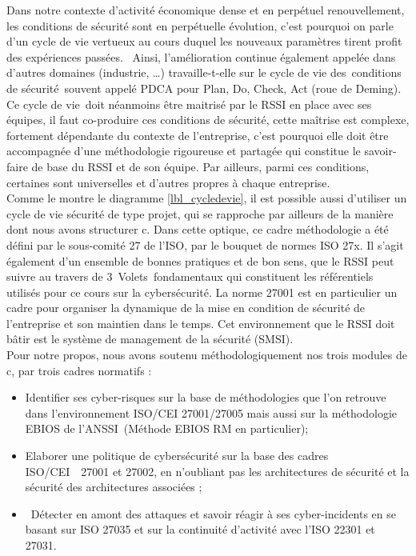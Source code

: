 Dans notre contexte d'activité économique dense et en perpétuel renouvellement, les conditions de sécurité sont en perpétuelle évolution, c’est pourquoi on parle d'un cycle de vie vertueux au cours duquel les nouveaux paramètres tirent profit des expériences passées.  Ainsi, l’amélioration continue également appelée  dans d’autres domaines (industrie, …) travaille-t-elle sur le cycle de vie des conditions de sécurité souvent appelé PDCA pour Plan, Do, Check, Act (roue de Deming).\\
Ce cycle de vie doit néanmoins être maitrisé par le RSSI en place avec ses équipes, il faut co-produire ces conditions de sécurité, cette maîtrise est complexe, fortement dépendante du contexte de l'entreprise, c’est pourquoi elle doit être accompagnée d'une méthodologie rigoureuse et partagée qui constitue le savoir-faire de base du RSSI et de son équipe. Par ailleurs, parmi ces conditions, certaines sont universelles et d’autres propres à chaque entreprise. \\ Comme le montre le diagramme \ref{lbl_cycledevie}, il est possible aussi d’utiliser un cycle de vie sécurité de type projet, qui se rapproche par ailleurs de la manière dont nous avons structurer c\edoc. 
Dans cette optique, ce cadre méthodologie a été défini par le sous-comité 27 de l'ISO, par le bouquet de normes ISO 27x. Il s’agit également d'un ensemble de bonnes pratiques et de bon sens, que le RSSI peut suivre au travers de 3 Volets fondamentaux qui constituent les référentiels utilisés pour ce cours sur la cybersécurité. La norme 27001 est en particulier un cadre pour organiser la dynamique de la mise en condition de sécurité de l’entreprise et son maintien dans le temps. Cet environnement que le RSSI doit bâtir est le système de management de la sécurité (SMSI).\\
Pour notre propos, nous avons soutenu méthodologiquement nos trois modules de c\edoc, par trois cadres normatifs :
 
\begin{itemize}
\item Identifier ses cyber-risques sur la base de méthodologies que l’on retrouve dans l’environnement ISO/CEI 27001/27005 mais aussi sur la méthodologie EBIOS de l’ANSSI (Méthode EBIOS RM en particulier); 
\item Elaborer une politique de cybersécurité sur la base des cadres ISO/CEI  27001 et 27002, en n’oubliant pas les architectures de sécurité et la sécurité des architectures associées ; 
\item Détecter en amont des attaques et savoir réagir à ses cyber-incidents en se basant sur ISO 27035 et sur la continuité d’activité avec l’ISO 22301 et 27031.
\end{itemize}


